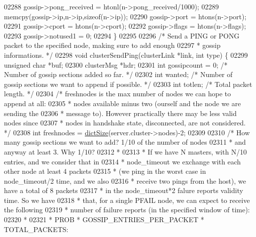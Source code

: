 \begin{DoxyCode}
{{{{{{{{{{{{{{{{{{{{{{{{{{{{{{{{{{{{{{02288     gossip->pong\_received = htonl(n->pong\_received/1000);
02289     memcpy(gossip->ip,n->ip,\textcolor{keyword}{sizeof}(n->ip));
02290     gossip->port = htons(n->port);
02291     gossip->cport = htons(n->cport);
02292     gossip->flags = htons(n->flags);
02293     gossip->notused1 = 0;
02294 \}
02295 
02296 \textcolor{comment}{/* Send a PING or PONG packet to the specified node, making sure to add enough}
02297 \textcolor{comment}{ * gossip informations. */}
02298 \textcolor{keywordtype}{void} clusterSendPing(clusterLink *link, \textcolor{keywordtype}{int} type) \{
02299     \textcolor{keywordtype}{unsigned} \textcolor{keywordtype}{char} *buf;
02300     clusterMsg *hdr;
02301     \textcolor{keywordtype}{int} gossipcount = 0; \textcolor{comment}{/* Number of gossip sections added so far. */}
02302     \textcolor{keywordtype}{int} wanted; \textcolor{comment}{/* Number of gossip sections we want to append if possible. */}
02303     \textcolor{keywordtype}{int} totlen; \textcolor{comment}{/* Total packet length. */}
02304     \textcolor{comment}{/* freshnodes is the max number of nodes we can hope to append at all:}
02305 \textcolor{comment}{     * nodes available minus two (ourself and the node we are sending the}
02306 \textcolor{comment}{     * message to). However practically there may be less valid nodes since}
02307 \textcolor{comment}{     * nodes in handshake state, disconnected, are not considered. */}
02308     \textcolor{keywordtype}{int} freshnodes = \hyperlink{dict_8h_af193430dd3d5579a52b194512f72c1f0}{dictSize}(server.cluster->nodes)-2;
02309 
02310     \textcolor{comment}{/* How many gossip sections we want to add? 1/10 of the number of nodes}
02311 \textcolor{comment}{     * and anyway at least 3. Why 1/10?}
02312 \textcolor{comment}{     *}
02313 \textcolor{comment}{     * If we have N masters, with N/10 entries, and we consider that in}
02314 \textcolor{comment}{     * node\_timeout we exchange with each other node at least 4 packets}
02315 \textcolor{comment}{     * (we ping in the worst case in node\_timeout/2 time, and we also}
02316 \textcolor{comment}{     * receive two pings from the host), we have a total of 8 packets}
02317 \textcolor{comment}{     * in the node\_timeout*2 falure reports validity time. So we have}
02318 \textcolor{comment}{     * that, for a single PFAIL node, we can expect to receive the following}
02319 \textcolor{comment}{     * number of failure reports (in the specified window of time):}
02320 \textcolor{comment}{     *}
02321 \textcolor{comment}{     * PROB * GOSSIP\_ENTRIES\_PER\_PACKET * TOTAL\_PACKETS:}
}}}}}}}}}}}}}}}}}}}}}}}}}}}}}}}}}}}}}}
\end{DoxyCode}
